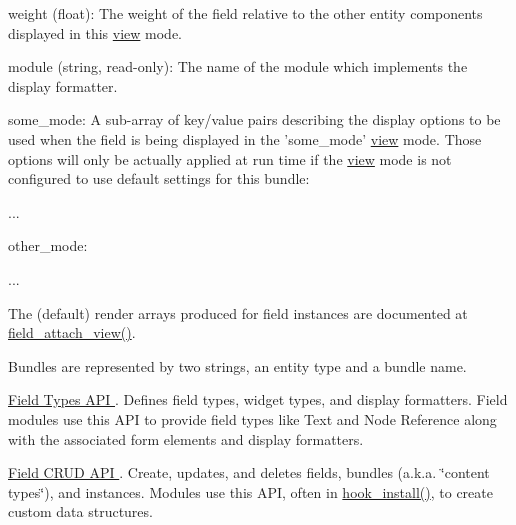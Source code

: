\begin{DoxyItemize}
\begin{DoxyItemize}
\begin{DoxyItemize}
\item weight (float): The weight of the field relative to the other entity components displayed in this \hyperlink{classview}{view} mode.
\item module (string, read-\/only): The name of the module which implements the display formatter.
\end{DoxyItemize}
\item some\_\-mode: A sub-\/array of key/value pairs describing the display options to be used when the field is being displayed in the 'some\_\-mode' \hyperlink{classview}{view} mode. Those options will only be actually applied at run time if the \hyperlink{classview}{view} mode is not configured to use default settings for this bundle:
\begin{DoxyItemize}
\item ...
\end{DoxyItemize}
\item other\_\-mode:
\begin{DoxyItemize}
\item ...
\end{DoxyItemize}
\end{DoxyItemize}
\end{DoxyItemize}

The (default) render arrays produced for field instances are documented at \hyperlink{group__field__attach_gaa752a8fd31173fd2308d71eb059e00c7}{field\_\-attach\_\-view()}.

Bundles are represented by two strings, an entity type and a bundle name.


\begin{DoxyItemize}
\item \hyperlink{group__field__types}{Field Types API }. Defines field types, widget types, and display formatters. Field modules use this API to provide field types like Text and Node Reference along with the associated form elements and display formatters.
\end{DoxyItemize}


\begin{DoxyItemize}
\item \hyperlink{group__field__crud}{Field CRUD API }. Create, updates, and deletes fields, bundles (a.k.a. \char`\"{}content types\char`\"{}), and instances. Modules use this API, often in \hyperlink{group__hooks_ga1ecdb5a2a046ea63dc790c3ed90338e5}{hook\_\-install()}, to create custom data structures.
\end{DoxyItemize}



